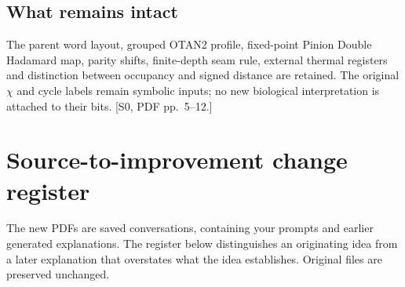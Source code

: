 \documentclass[10pt,a4paper]{article}
\numberwithin{equation}{section}
\newcommand{\newpart}{\clearpage}
\begin{document}
\subsection*{What remains intact}
The parent word layout, grouped OTAN2 profile, fixed-point Pinion Double Hadamard map, parity shifts, finite-depth seam rule, external thermal registers and distinction between occupancy and signed distance are retained. The original $\chi$ and cycle labels remain symbolic inputs; no new biological interpretation is attached to their bits. [S0, PDF pp.~5--12.]

\newpart
\section{Source-to-improvement change register}
\label{sec:register}
The new PDFs are saved conversations, containing your prompts and earlier generated explanations. The register below distinguishes an originating idea from a later explanation that overstates what the idea establishes. Original files are preserved unchanged.
\end{document}
